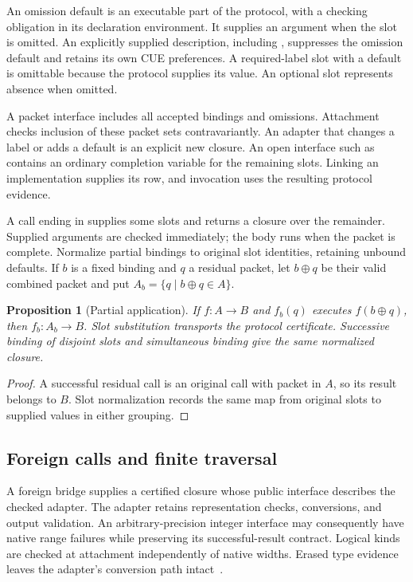 \documentclass[10pt,a4paper]{article}
\newcommand{\code}[1]{\texttt{\detokenize{#1}}}
\newtheorem{proposition}[definition]{Proposition}
\theoremstyle{remark}
\begin{document}
An omission default \code{= d} is an executable part of the protocol, with a
checking obligation in its declaration environment. It supplies an argument
when the slot is omitted. An explicitly supplied description, including
\code{_}, suppresses the omission default and retains its own CUE preferences.
A required-label slot with a default is omittable because the protocol supplies
its value. An optional slot represents absence when omitted.

A packet interface includes all accepted bindings and omissions. Attachment
checks inclusion of these packet sets contravariantly. An adapter that changes
a label or adds a default is an explicit new closure. An open interface such as
\code{func(a: int, ...) -> number} contains an ordinary completion variable for
the remaining slots. Linking an implementation supplies its row, and invocation
uses the resulting protocol evidence.

A call ending in \code{...} supplies some slots and returns a closure over the
remainder. Supplied arguments are checked immediately; the body runs when the
packet is complete. Normalize partial bindings to original slot identities,
retaining unbound defaults. If $b$ is a fixed binding and $q$ a residual packet,
let $b\oplus q$ be their valid combined packet and put
$A_b=\{q\mid b\oplus q\in A\}$.

\begin{proposition}[Partial application]\label{prop:partial}
If $f:A\to B$ and $f_b(q)$ executes $f(b\oplus q)$, then $f_b:A_b\to B$.
Slot substitution transports the protocol certificate. Successive binding of
disjoint slots and simultaneous binding give the same normalized closure.
\end{proposition}
\begin{proof}
A successful residual call is an original call with packet in $A$, so its result
belongs to $B$. Slot normalization records the same map from original slots
to supplied values in either grouping.
\end{proof}

\subsection{Foreign calls and finite traversal}
A foreign bridge supplies a certified closure whose public interface describes
the checked adapter. The adapter retains representation checks, conversions,
and output validation. An arbitrary-precision integer interface may consequently
have native range failures while preserving its successful-result contract.
Logical kinds are checked at attachment independently of native widths.
Erased type evidence leaves the adapter's conversion path intact~\cite{cueaddendum}.
\end{document}
